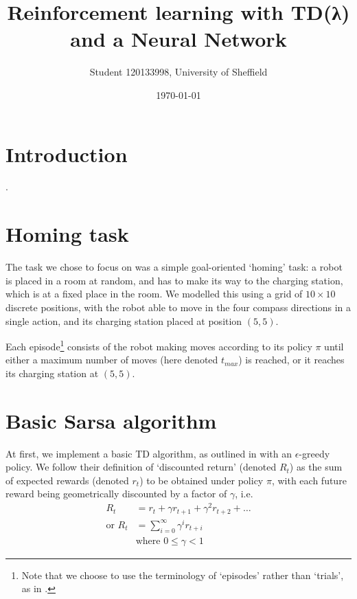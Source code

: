 \documentclass[a4paper, 11pt, twocolumn, draft]{article} %
\title{Reinforcement learning with TD(λ) and a Neural Network}
\author{Student 120133998, University of Sheffield}
\date{\today}
\begin{document}

\section{Introduction} .

\section{Homing task} The task we chose to focus on was a simple goal-oriented
`homing' task: a robot is placed in a room at random, and has to make its way to
the charging station, which is at a fixed place in the room.  We modelled this
using a grid of $10\times10$ discrete positions, with the robot able to move in
the four compass directions in a single action, and its charging station placed
at position $(5, 5)$.

Each episode\footnote{Note that we choose to use the terminology of `episodes'
rather than `trials', as in \cite{Sutton1998}.} consists of the robot making
moves according to its policy $\pi$ until either a maximum number of moves (here
denoted $t_{max}$) is reached, or it reaches its charging station at $(5, 5)$.

\section{Basic Sarsa algorithm} At first, we implement a basic TD algorithm, as
outlined in \cite[Chapter~6]{Sutton1998} with an $\epsilon$-greedy policy.  We
follow their definition of `discounted return' (denoted $R_t$) as the sum of
expected rewards (denoted $r_t$) to be obtained under policy $\pi$, with each
future reward being geometrically discounted by a factor of $\gamma$, i.e.
\begin{align}
R_t &= r_t + \gamma r_{t+1} + \gamma^2 r_{t+2} + \ldots \nonumber \\
\text{or } R_t &= \sum_{i=0}^{\infty}{\gamma^ir_{t+i}} \\
&\text{where }0 \le \gamma < 1 \nonumber
\end{align}
\end{document}
